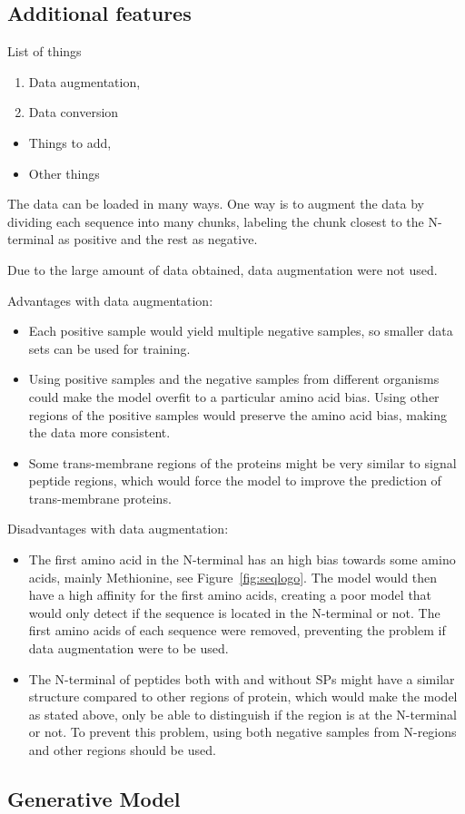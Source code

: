 \subsection{Additional features}


List of things
\begin{enumerate}
\item Data augmentation,
\item Data conversion
\end{enumerate}
\begin{itemize}
\item Things to add,
\item Other things
\end{itemize}


The data can be loaded in many ways. One way is to augment the data by dividing each sequence into many chunks, labeling the chunk closest to the N-terminal as positive and the rest as negative.

Due to the large amount of data obtained, data augmentation were not used.
\linebreak

Advantages with data augmentation:
\begin{itemize}
\item Each positive sample would yield multiple negative samples, so smaller data sets can be used for training.
\item Using positive samples and the negative samples from different organisms could make the model overfit to a particular amino acid bias. Using other regions of the positive samples would preserve the amino acid bias, making the data more consistent.
\item Some trans-membrane regions of the proteins might be very similar to signal peptide regions, which would force the model to improve the prediction of trans-membrane proteins. 
\end{itemize}

Disadvantages with data augmentation:
\begin{itemize}
\item The first amino acid in the N-terminal has an high bias towards some amino acids, mainly Methionine, see Figure~\ref{fig:seqlogo}. The model would then have a high affinity for the first amino acids, creating a poor model that would only detect if the sequence is located in the N-terminal or not. The first amino acids of each sequence were removed, preventing the problem if data augmentation were to be used.
\item The N-terminal of peptides both with and without SPs might have a similar structure compared to other regions of protein, which would make the model as stated above, only be able to distinguish if the region is at the N-terminal or not. To prevent this problem, using both negative samples from N-regions and other regions should be used.
\end{itemize}

\subsection{Generative Model} \label{GAN}





